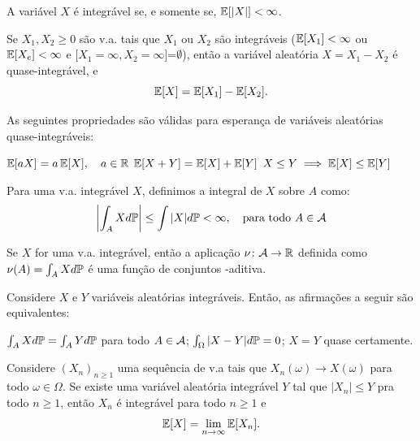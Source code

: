 \begin{note}
	A variável $X$ é integrável se, e somente se, $\E[|X|]<\infty$.
\end{note}

\begin{lemma}
	Se $X_1,X_2\geq0$ são v.a. tais que $X_1$ ou $X_2$ são integráveis ($\E[X_1]<\infty$ ou $\E[X_e]<\infty$ e $[X_1=\infty, X_2=\infty$]=$\emptyset$), então a variável aleatória $X = X_1-X_2$ é quase-integrável, e
	\[
	\E[X] = \E[X_1] - \E[X_2].
	\]
\end{lemma}

\begin{theorem}
	As seguintes propriedades são válidas para esperança de variáveis aleatórias quase-integráveis:
	\begin{outline}[enumerate]
		\1 \(\E[aX] = a\E[X], \quad a\in \Re\)
		\1 \(\E[X+Y] = \E[X] + \E[Y]\)
		\1 \(X\leq Y \implies \E[X]\leq\E[Y]\)
	\end{outline}
\end{theorem}

\begin{definition}
	Para uma v.a. integrável $X$, definimos a integral de $X$ sobre $A$ como:
	\begin{equation}
		\left| \int_A X d\P \right| \leq \int |X| d\P < \infty, \quad \text{para todo } A\in\Acal
	\end{equation}
\end{definition}

\begin{theorem}
	Se $X$ for uma v.a. integrável, então a aplicação \(\mathmbox{\nu\colon \Acal \to \Re}\) definida como \(\nu(A) = \int_A X d\P\) é uma função de conjuntos \sig-aditiva.
\end{theorem}

\begin{theorem}
	Considere $X$ e $Y$ variáveis aleatórias integráveis. Então, as afirmações a seguir são equivalentes:
	\begin{outline}[enumerate]
		\1 \( \int_A X d\P = \int_A Y d\P\) para todo $A\in\Acal$;
		\1 \( \int_{\Omega} |X-Y| d\P = 0\);
		\1 $X=Y$ quase certamente.
	\end{outline}
\end{theorem}

\begin{theorem}
	Considere $(X_n)_{n\geq1}$ uma sequência de v.a tais que \(X_n(\omega)\to X(\omega)\) para todo $\omega\in\Omega$. Se existe uma variável aleatória integrável $Y$ tal que $|X_n|\leq Y$ pra todo $n\geq1$, então $X_n$ é integrável para todo $n\geq1$ e
	\[
		\E[X] = \lim\limits_{n\to\infty}\E[X_n].
	\]
\end{theorem}

